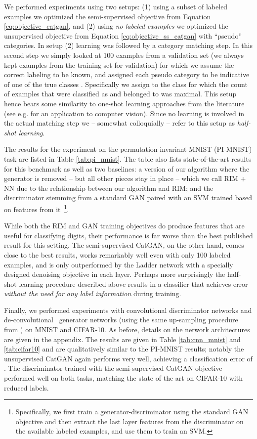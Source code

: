 \documentclass{article} \usepackage{iclr2016_conference,times}
\begin{document}
We performed experiments using two setups: (1) using a subset of
labeled examples we optimized the semi-supervised objective from
Equation \eqref{eq:objective_catgan}, and (2) using \emph{no labeled
  examples} we optimized the unsupervised objective from Equation
\eqref{eq:objective_ss_catgan} with  ``pseudo'' categories. In
setup (2) learning was followed by a category matching step. In this
second step we simply looked at 100 examples from a validation set (we
always kept  examples from the training set for validation) for
which we assume the correct labeling to be known, and assigned each
pseudo category  to be indicative of one of the true classes
. Specifically we assign  to
the class  for which the count of examples that were classified as
 and belonged to  was maximal. This setup hence bears some
similarity to one-shot learning approaches from the literature (see
e.g. \citet{FeiFeiFergusPeronaPAMI} for an application to computer
vision). Since no learning is involved in the actual matching step we
-- somewhat colloquially -- refer to this setup as \emph{half-shot
  learning}.

The results for the experiment on the permutation invariant MNIST
(PI-MNIST) task are listed in Table \ref{tab:pi_mnist}. The table also
lists state-of-the-art results for this benchmark as well as two
baselines: a version of our algorithm where the generator is removed
-- but all other pieces stay in place -- which we call RIM + NN due to
the relationship between our algorithm and RIM; and the discriminator
stemming from a standard GAN paired with an SVM trained based on
features from it~\footnote{Specifically, we first train a
  generator-discriminator using the standard GAN objective and then
  extract the last layer features from the discriminator on the
  available labeled examples, and use them to train an SVM.}.

While both the RIM and GAN training objectives do produce features
that are useful for classifying digits, their performance is far worse
than the best published result for this setting. The semi-supervised
CatGAN, on the other hand, comes close to the best results, works
remarkably well even with only 100 labeled examples, and is only
outperformed by the Ladder network with a specially designed denoising
objective in each layer.
Perhaps more surprisingly the half-shot learning procedure
described above results in a classifier that achieves 
error \emph{without the need for any label information} during training. 

Finally, we performed experiments with convolutional discriminator
networks and de-convolutional~\citep{Zeiler_ICCV2011} generator
networks (using the same up-sampling procedure from
\citet{DosSprChair15}) on MNIST and CIFAR-10. As before, details on
the network architectures are given in the appendix. The results are
given in Table \ref{tab:cnn_mnist} and \ref{tab:cifar10} and are
qualitatively similar to the PI-MNIST results; notably the
unsupervised CatGAN again performs very well, achieving a classification error
of . The discriminator trained with the semi-supervised CatGAN
objective performed well on both tasks, matching the state of the art
on CIFAR-10 with reduced labels.
\end{document}
